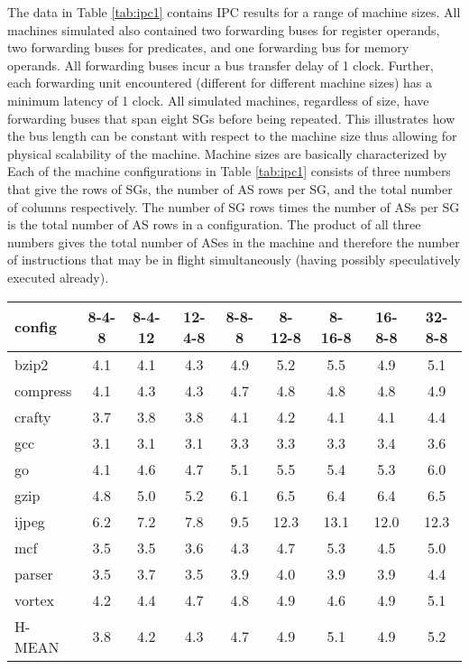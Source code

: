 \documentclass[10pt,twocolumn]{article}
\begin{document}
The data in Table \ref{tab:ipc1} contains IPC 
results for a range of machine sizes.
All machines simulated also contained two forwarding buses for
register operands, two forwarding buses for predicates, and
one forwarding bus for memory operands.
All forwarding buses incur a bus transfer delay of 1 clock.
Further, each forwarding unit encountered (different for different
machine sizes) has a minimum latency of 1 clock.
All simulated machines, regardless of size, have forwarding buses
that span eight SGs before being repeated.  
This illustrates how the bus
length can be constant with respect to the machine size thus allowing
for physical scalability of the machine.
Machine sizes are basically characterized by
Each of the machine configurations in Table \ref{tab:ipc1} consists of three
numbers that give the rows of SGs, the number
of AS rows per SG, and the total number of 
columns respectively.  The number of SG rows times the
number of ASs per SG is the total number of
AS rows in a configuration.  The product of all three
numbers gives the total number of ASes in the machine and therefore
the number of instructions that may be in flight 
simultaneously
(having
possibly speculatively executed already).
%
\begin{table*}
\begin{center}
\caption{{\em Benchmark IPC results for various machine sizes.}
Different machine sizes are characterized by their
geometries consisting of the three-number entries along the
top of the table: SG rows per column, AS rows per SG, and
SG columns.}
\label{tab:ipc1}
\scriptsize{
\begin{tabular}{|l|c|c|c|c|c|c|c|c|}
\hline 
config&
8-4-8&8-4-12&12-4-8&8-8-8&8-12-8&8-16-8&16-8-8&32-8-8\\
\hline
\hline 
bzip2&4.1&4.1&4.3&4.9&5.2&5.5&4.9&5.1\\
\hline 
compress&4.1&4.3&4.3&4.7&4.8&4.8&4.8&4.9\\
\hline 
crafty&3.7&3.8&3.8&4.1&4.2&4.1&4.1&4.4\\
\hline 
gcc&3.1&3.1&3.1&3.3&3.3&3.3&3.4&3.6\\
\hline 
go&4.1&4.6&4.7&5.1&5.5&5.4&5.3&6.0\\
\hline 
gzip&4.8&5.0&5.2&6.1&6.5&6.4&6.4&6.5\\
\hline 
ijpeg&6.2&7.2&7.8&9.5&12.3&13.1&12.0&12.3\\
\hline 
mcf&3.5&3.5&3.6&4.3&4.7&5.3&4.5&5.0\\
\hline 
parser&3.5&3.7&3.5&3.9&4.0&3.9&3.9&4.4\\
\hline 
vortex&4.2&4.4&4.7&4.8&4.9&4.6&4.9&5.1\\
\hline 
\hline 
H-MEAN&3.8&4.2&4.3&4.7&4.9&5.1&4.9&5.2\\
\hline
\end{tabular}
}
\end{center}
\end{table*}
%
\end{document}
